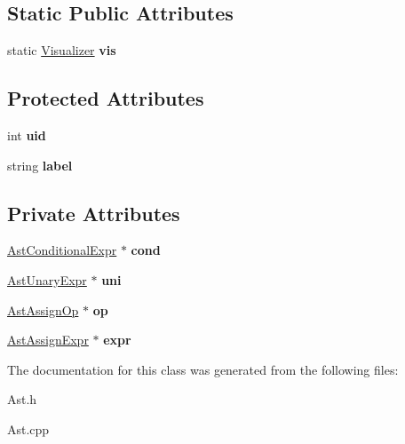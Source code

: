 \subsection*{Static Public Attributes}
\begin{DoxyCompactItemize}
\item 
\hypertarget{classAST_aca9e6637209b31e03a09c0d42f29bdfa}{static \hyperlink{classVisualizer}{Visualizer} {\bfseries vis}}\label{classAST_aca9e6637209b31e03a09c0d42f29bdfa}

\end{DoxyCompactItemize}
\subsection*{Protected Attributes}
\begin{DoxyCompactItemize}
\item 
\hypertarget{classAST_a847b778f1c3dd5a19de32de432ee6e15}{int {\bfseries uid}}\label{classAST_a847b778f1c3dd5a19de32de432ee6e15}

\item 
\hypertarget{classAST_ab2e239ccc0688d2341724432ff5a1a31}{string {\bfseries label}}\label{classAST_ab2e239ccc0688d2341724432ff5a1a31}

\end{DoxyCompactItemize}
\subsection*{Private Attributes}
\begin{DoxyCompactItemize}
\item 
\hypertarget{classAstAssignExpr_a9ae861a32cb9430c1eef21bb5749b9ed}{\hyperlink{classAstConditionalExpr}{Ast\-Conditional\-Expr} $\ast$ {\bfseries cond}}\label{classAstAssignExpr_a9ae861a32cb9430c1eef21bb5749b9ed}

\item 
\hypertarget{classAstAssignExpr_ade35c6ab23d815ecd8878378ea315cd8}{\hyperlink{classAstUnaryExpr}{Ast\-Unary\-Expr} $\ast$ {\bfseries uni}}\label{classAstAssignExpr_ade35c6ab23d815ecd8878378ea315cd8}

\item 
\hypertarget{classAstAssignExpr_a47e6529240ee478c3f51bac220bac268}{\hyperlink{classAstAssignOp}{Ast\-Assign\-Op} $\ast$ {\bfseries op}}\label{classAstAssignExpr_a47e6529240ee478c3f51bac220bac268}

\item 
\hypertarget{classAstAssignExpr_a25ba593378fd669c82f9ae92e87b458b}{\hyperlink{classAstAssignExpr}{Ast\-Assign\-Expr} $\ast$ {\bfseries expr}}\label{classAstAssignExpr_a25ba593378fd669c82f9ae92e87b458b}

\end{DoxyCompactItemize}


The documentation for this class was generated from the following files\-:\begin{DoxyCompactItemize}
\item 
Ast.\-h\item 
Ast.\-cpp\end{DoxyCompactItemize}
